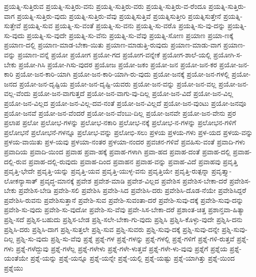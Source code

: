 {ಪ್ರಯತ್ನಿ-ಸುತ್ತಿರುವ
ಪ್ರಯತ್ನಿ-ಸುತ್ತಿರು-ವನು
ಪ್ರಯತ್ನಿ-ಸುತ್ತಿರು-ವರು
ಪ್ರಯತ್ನಿ-ಸುತ್ತಿರು-ವ-ರೆಂದೂ
ಪ್ರಯತ್ನಿ-ಸುತ್ತಿರು-ವಾಗ
ಪ್ರಯತ್ನಿ-ಸುತ್ತಿರು-ವುದು
ಪ್ರಯತ್ನಿ-ಸುತ್ತಿರು-ವೆವು
ಪ್ರಯತ್ನಿಸುತ್ತಿವೆ
ಪ್ರಯತ್ನಿಸುತ್ತೀರಿ
ಪ್ರಯತ್ನಿಸುತ್ತೇನೆ
ಪ್ರಯತ್ನಿ-ಸುತ್ತೇವೆ
ಪ್ರಯತ್ನಿ-ಸುವ
ಪ್ರಯತ್ನಿ-ಸು-ವಂತೆ
ಪ್ರಯತ್ನಿ-ಸು-ವನು
ಪ್ರಯತ್ನಿ-ಸು-ವರೊ
ಪ್ರಯತ್ನಿ-ಸು-ವು-ದನ್ನು
ಪ್ರಯತ್ನಿ-ಸು-ವುದು
ಪ್ರಯತ್ನಿ-ಸು-ವುದೇ
ಪ್ರಯತ್ನಿ-ಸು-ವೆನು
ಪ್ರಯತ್ನಿ-ಸು-ವೆವು
ಪ್ರಯತ್ನಿ-ಸೋಣ
ಪ್ರಯಾಣ
ಪ್ರಯಾ-ಣಕ್ಕೆ
ಪ್ರಯಾಣ-ದಲ್ಲಿ
ಪ್ರಯಾಣ-ಮಾಡ-ಬೇಕಾ-ಯಿತು
ಪ್ರಯಾಣ-ಮಾಡುತ್ತಿ-ರುವುದು
ಪ್ರಯಾಣ-ಮಾಡು-ವಾಗ
ಪ್ರಯಾಣ-ವನ್ನು
ಪ್ರಯಾಣ-ವನ್ನೆ
ಪ್ರಯೋ
ಪ್ರಯೋಗ
ಪ್ರಯೋ-ಗದ
ಪ್ರಯೋಗ-ವನ್ನೇಕೆ
ಪ್ರಯೋಗ-ಶಾಲೆ-ಯಲ್ಲಿ
ಪ್ರಯೋಗಿ-ಸ-ಬೇಕು
ಪ್ರಯೋ-ಗಿಸಿ
ಪ್ರಯೋ-ಗಿಸು-ವುದರ
ಪ್ರಯೋಜ
ಪ್ರಯೋ-ಜಕಂ
ಪ್ರಯೋ-ಜನ
ಪ್ರಯೋ-ಜನ-ಕರ
ಪ್ರಯೋ-ಜನ-ಕಾರಿ
ಪ್ರಯೋ-ಜನ-ಕಾರಿ-ಯಾಗಿ
ಪ್ರಯೋ-ಜನ-ಕಾರಿ-ಯಾಗಿ-ರು-ವುದು
ಪ್ರಯೋ-ಜನಕ್ಕೆ
ಪ್ರಯೋ-ಜನ-ಗಳಲ್ಲಿ
ಪ್ರಯೋ-ಜನದ
ಪ್ರಯೋ-ಜನ-ದೃಷ್ಟಿಯ
ಪ್ರಯೋ-ಜನ-ದೃಷ್ಟಿ-ಯವರು
ಪ್ರಯೋ-ಜನ-ವನ್ನು
ಪ್ರಯೋ-ಜನ-ವಲ್ಲ
ಪ್ರಯೋ-ಜನ-ವಲ್ಲ-ವೆಂದು
ಪ್ರಯೋ-ಜನ-ವಾಗುತ್ತದೆ
ಪ್ರಯೋ-ಜನ-ವಾಗು-ವು-ದಿಲ್ಲ
ಪ್ರಯೋ-ಜನ-ವಿದೆ
ಪ್ರಯೋ-ಜನ-ವಿಲ್ಲ
ಪ್ರಯೋ-ಜನ-ವಿಲ್ಲದ
ಪ್ರಯೋ-ಜನ-ವಿಲ್ಲ-ದವ-ನಂತೆ
ಪ್ರಯೋ-ಜನ-ವಿಲ್ಲದೆ
ಪ್ರಯೋ-ಜನ-ವುಂಟು
ಪ್ರಯೋ-ಜನವೂ
ಪ್ರಯೋ-ಜನವೆ
ಪ್ರಯೋ-ಜನ-ವೆಂದರೆ
ಪ್ರಯೋ-ಜನ-ವೆಂಬು-ದಿಲ್ಲ
ಪ್ರಯೋ-ಜನವೇ
ಪ್ರಯೋ-ಜನ-ವೇನು
ಪ್ರರ
ಪ್ರಲಾಪ
ಪ್ರಲೋ
ಪ್ರಲೋಭ-ಗಳನ್ನು
ಪ್ರಲೋಭ-ನಕಾರಿ
ಪ್ರಲೋಭ-ನಕ್ಕೆ
ಪ್ರಲೋಭ-ನ-ಗಳನ್ನು
ಪ್ರಲೋಭನ-ಗಳಿಗೆ
ಪ್ರಲೋಭನೆ
ಪ್ರಲೋಭನೆ-ಗಳನ್ನೂ
ಪ್ರಲೋಭ-ವನ್ನು
ಪ್ರಲೋಭಿ-ಸಲು
ಪ್ರಳಯ
ಪ್ರಳಯ-ಗಳು
ಪ್ರಳ-ಯದ
ಪ್ರಳಯ-ವನ್ನು
ಪ್ರಳಯ-ವಾಯಿತು
ಪ್ರಳ-ಯವು
ಪ್ರಳಯಾ-ನಂತರ
ಪ್ರಳಯಾ-ನಂದರ
ಪ್ರವಚನ-ಗಳಿವೆ
ಪ್ರವಹಿಸು-ವಂತೆ
ಪ್ರವಾದಿ-ಗಳು
ಪ್ರವಾದಿಯ
ಪ್ರವಾದಿ-ಯಿಂದ
ಪ್ರವಾಹ
ಪ್ರವಾ-ಹಕ್ಕೆ
ಪ್ರವಾಹ-ಗಳಾಗಿ
ಪ್ರವಾ-ಹದ
ಪ್ರವಾಹ-ದಂತೆ
ಪ್ರವಾಹ-ದಲ್ಲಿ
ಪ್ರವಾಹ-ದಲ್ಲಿ-ರುವ
ಪ್ರವಾಹ-ದಲ್ಲಿ-ರುವುದು
ಪ್ರವಾಹ-ದಿಂದ
ಪ್ರವಾಹನ
ಪ್ರವಾಹ-ವನ್ನು
ಪ್ರವಾಹ-ವಿದೆ
ಪ್ರವಾಹವು
ಪ್ರವೃತ್ತಿ
ಪ್ರವೃತ್ತಿ-ಭೇದೇ
ಪ್ರವೃತ್ತಿ-ಯನ್ನು
ಪ್ರವೃತ್ತಿ-ಯವ
ಪ್ರವೃತ್ತಿ-ಯುಳ್ಳ-ವನು
ಪ್ರವೃತ್ತಿಯೇ
ಪ್ರವೃತ್ತಿ-ರುತ್ಪನ್ನಾ
ಪ್ರವೃತ್ತ್ಯಾ-ಲೋಕನ್ಯಾಸಾತ್
ಪ್ರವೃದ್ಧ-ಮಾನಕ್ಕೆ
ಪ್ರವೇಶ
ಪ್ರವೇಶ-ಮಾಡಿ
ಪ್ರವೇಶ-ವಿಲ್ಲದ
ಪ್ರವೇಶಿಸ
ಪ್ರವೇಶಿಸ-ಬೇಕಾ-ದರೆ
ಪ್ರವೇಶಿಸ-ಬೇಕು
ಪ್ರವೇಶಿಸ-ಬೇಡಿ
ಪ್ರವೇಶಿ-ಸಲಿ
ಪ್ರವೇಶಿಸಿ
ಪ್ರವೇಶಿ-ಸಿದ
ಪ್ರವೇಶಿಸಿ-ದರು
ಪ್ರವೇಶಿಸಿ-ದೊಡ-ನೆಯೇ
ಪ್ರವೇಶಿಸಿದ್ದರೆ
ಪ್ರವೇಶಿಸಿ-ರುವನು
ಪ್ರವೇಶಿಸುತ್ತಾನೆ
ಪ್ರವೇಶಿ-ಸುವ
ಪ್ರವೇಶಿ-ಸುವಂತಾ-ದರೆ
ಪ್ರವೇಶಿ-ಸುವು-ದಕ್ಕೆ
ಪ್ರವೇಶಿ-ಸುವು-ದನ್ನು
ಪ್ರವೇಶಿ-ಸು-ವುದು
ಪ್ರವೇಶಿ-ಸು-ವುದೋ
ಪ್ರವೇಶಿ-ಸು-ವೆವು
ಪ್ರವೇ-ಸಿಸ-ಬೇಕಾ-ದರೆ
ಪ್ರಶಾಂತ-ಚಿತ್ತ
ಪ್ರಶಾನ್ತವಾ-ಹಿತ್ಯಾ
ಪ್ರಶ್ನಿ-ಸದೆ
ಪ್ರಶ್ನಿಸ-ಬಹುದು
ಪ್ರಶ್ನಿಸ-ಬೇಡ
ಪ್ರಶ್ನಿ-ಸಲೇ-ಬೇಕಾ-ಗು-ವುದು
ಪ್ರಶ್ನಿಸಿ
ಪ್ರಶ್ನಿಸಿ-ಕೊಳ್ಳು-ವುದೇ
ಪ್ರಶ್ನಿಸಿ-ದನು
ಪ್ರಶ್ನಿಸಿ-ದರು
ಪ್ರಶ್ನಿಸಿ-ದಾಗ
ಪ್ರಶ್ನಿ-ಸುತ್ತಲೇ
ಪ್ರಶ್ನಿ-ಸುವ
ಪ್ರಶ್ನಿ-ಸುವರು
ಪ್ರಶ್ನಿ-ಸುವು-ದಕ್ಕೆ
ಪ್ರಶ್ನಿ-ಸುವು-ದನ್ನೇ
ಪ್ರಶ್ನಿ-ಸುವು-ದಿಲ್ಲ
ಪ್ರಶ್ನಿ-ಸು-ವುದು
ಪ್ರಶ್ನಿ-ಸು-ವೆವು
ಪ್ರಶ್ನೆ
ಪ್ರಶ್ನೆ-ಗಳ
ಪ್ರಶ್ನೆ-ಗಳನ್ನು
ಪ್ರಶ್ನೆ-ಗಳಲ್ಲಿ
ಪ್ರಶ್ನೆ-ಗಳಿಗೆ
ಪ್ರಶ್ನೆ-ಗಳಿ-ರುತ್ತವೆ
ಪ್ರಶ್ನೆ-ಗಳು
ಪ್ರಶ್ನೆ-ಗಳೆದ್ದುವು
ಪ್ರಶ್ನೆ-ಗಳೆಲ್ಲ
ಪ್ರಶ್ನೆ-ಗಳೇಳು
ಪ್ರಶ್ನೆ-ಗಳೇ-ಳುತ್ತವೆ
ಪ್ರಶ್ನೆ-ಗಳೇ-ಳು-ವುವು
ಪ್ರಶ್ನೆಗೆ
ಪ್ರಶ್ನೆಯ
ಪ್ರಶ್ನೆ-ಯಂತೆಯೇ
ಪ್ರಶ್ನೆ-ಯನ್ನು
ಪ್ರಶ್ನೆ-ಯನ್ನೂ
ಪ್ರಶ್ನೆ-ಯನ್ನೇ
ಪ್ರಶ್ನೆ-ಯಲ್ಲಿ
ಪ್ರಶ್ನೆ-ಯಷ್ಟು
ಪ್ರಶ್ನೆ-ಯಾಗಿತ್ತು
ಪ್ರಶ್ನೆ-ಯಿಂದ
ಪ್ರಶ್ನೆಯು
}
